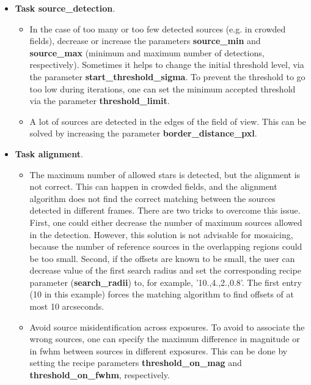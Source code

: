 \begin{itemize}
\item {\bf Task source\_detection}.

  \begin{itemize}

  \item In the case of too many or too few detected sources (e.g. in
    crowded fields), decrease or increase the parameters {\bf
      source\_min} and {\bf source\_max} (minimum and maximum number
    of detections, respectively). Sometimes it helps to change the
    initial threshold level, via the parameter {\bf
      start\_threshold\_sigma}. To prevent the threshold to go too low
    during iterations, one can set the minimum accepted threshold via
    the parameter {\bf threshold\_limit}.

  \item A lot of sources are detected in the edges of the field of
    view. This can be solved by increasing the parameter {\bf
      border\_distance\_pxl}.

  \end{itemize}
  
    \item {\bf Task alignment}.

      \begin{itemize}
      
  \item The maximum number of allowed stars is detected, but the
    alignment is not correct. This can happen in crowded fields, and
    the alignment algorithm does not find the correct matching between
    the sources detected in different frames. There are two tricks to
    overcome this issue. First, one could either decrease the number
    of maximum sources allowed in the detection. However, this
    solution is not advisable for mosaicing, because the number of
    reference sources in the overlapping regions could be too
    small. Second, if the offsets are known to be small, the user can
    decrease value of the first search radius and set the
    corresponding recipe parameter ({\bf search\_radii}) to, for
    example, '10.,4.,2.,0.8'. The first entry (10 in this example)
    forces the matching algorithm to find offsets of at most 10
    arcseconds.
    
  \item Avoid source misidentification across exposures. To avoid to
    associate the wrong sources, one can specify the maximum
    difference in magnitude or in fwhm between sources in different
    exposures. This can be done by setting the recipe parameters {\bf
      threshold\_on\_mag} and {\bf threshold\_on\_fwhm}, respectively.

      \end{itemize}
      
\end{itemize}

